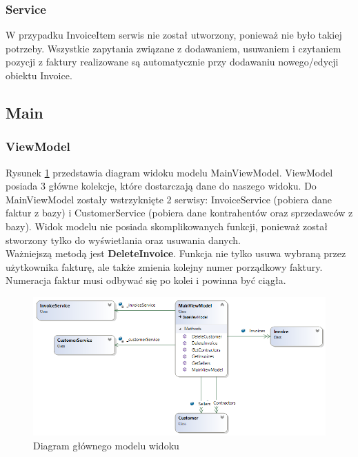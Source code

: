 \subsubsection{Service}
W przypadku InvoiceItem serwis nie został utworzony, ponieważ nie było takiej potrzeby. Wszystkie zapytania związane z dodawaniem, usuwaniem i czytaniem pozycji z faktury realizowane są automatycznie przy dodawaniu nowego/edycji obiektu Invoice.

\subsection{Main}

\subsubsection{ViewModel}
Rysunek \ref{fig:MainViewModelDiagram} przedstawia diagram widoku modelu MainViewModel. ViewModel posiada 3 główne kolekcje, które dostarczają dane do naszego widoku. Do MainViewModel zostały wstrzyknięte 2 serwisy: InvoiceService (pobiera dane faktur z bazy) i CustomerService (pobiera dane kontrahentów oraz sprzedawców z bazy). Widok modelu nie posiada skomplikowanych funkcji, ponieważ został stworzony tylko do wyświetlania oraz usuwania danych. \\
Ważniejszą metodą jest \textbf{DeleteInvoice}. Funkcja nie tylko usuwa wybraną przez użytkownika fakturę, ale także zmienia kolejny numer porządkowy faktury. Numeracja faktur musi odbywać się po kolei i powinna być ciągła.

\begin{figure}[ht!]
  \includegraphics[width=\linewidth]{Rysunki/MainViewModelDiagram.png}
  \caption{Diagram głównego modelu widoku}
  \label{fig:MainViewModelDiagram}
\end{figure}

